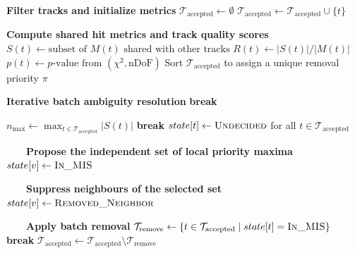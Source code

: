 \documentclass[11pt]{article}
\begin{document}
\begin{algorithm}
\caption{Jones-Plassmann Ambiguity Resolution}
\label{alg:jp_ambiguity}
\begin{algorithmic}[1]

\Statex \textbf{Filter tracks and initialize metrics}
\State $\mathcal{T}_{\mathrm{accepted}} \gets \emptyset$
        \State $\mathcal{T}_{\mathrm{accepted}} \gets \mathcal{T}_{\mathrm{accepted}} \cup \{t\}$
    \EndIf
\EndFor

\Statex
\Statex \textbf{Compute shared hit metrics and track quality scores}
    \State $S(t) \gets \text{subset of } M(t) \text{ shared with other tracks}$
    \State $R(t) \gets |S(t)|/|M(t)|$
    \State $p(t) \gets \text{$p$-value from } (\chi^2, \text{nDoF})$
\EndFor
\State Sort $\mathcal{T}_{\mathrm{accepted}}$ to assign a unique removal priority $\pi$

\Statex
\Statex \textbf{Iterative batch ambiguity resolution}
        \State \textbf{break}
    \EndIf

    \State $n_{\mathrm{max}} \gets \max_{t \in \mathcal{T}_{\mathrm{accepted}}} |S(t)|$
        \State \textbf{break}
    \EndIf
    \State $state[t] \gets \textproc{Undecided}$ for all $t \in \mathcal{T}_{\mathrm{accepted}}$

    \Statex
    \Statex \ \ \ \ \textbf{Propose the independent set of local priority maxima}
            \State $state[v] \gets \textproc{In\_MIS}$
        \EndIf
    \EndFor

    \Statex
    \Statex \ \ \ \ \textbf{Suppress neighbours of the selected set}
            \State $state[v] \gets \textproc{Removed\_Neighbor}$
        \EndIf
    \EndFor

    \Statex
    \Statex \ \ \ \ \textbf{Apply batch removal}
    \State $\mathcal{T}_{\mathrm{remove}} \gets \{t \in \mathcal{T}_{\mathrm{accepted}} \mid state[t] = \textproc{In\_MIS}\}$
        \State \textbf{break}
    \EndIf
    \State $\mathcal{T}_{\mathrm{accepted}} \gets \mathcal{T}_{\mathrm{accepted}} \setminus \mathcal{T}_{\mathrm{remove}}$


\end{algorithmic}
\end{algorithm}
\end{document}
